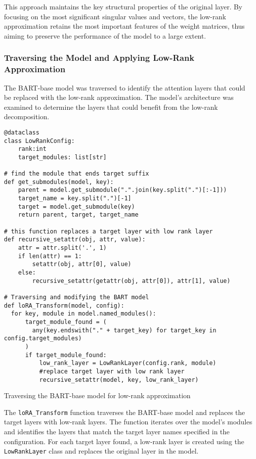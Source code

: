            This approach maintains the key structural properties of the original layer. By focusing on the most significant singular values and vectors, the low-rank approximation retains the most important features of the weight matrices, thus aiming to preserve the performance of the model to a large extent.

    \subsubsection{Traversing the Model and Applying Low-Rank Approximation}
        The BART-base model was traversed to identify the attention layers that could be replaced with the low-rank approximation. The model's architecture was examined to determine the layers that could benefit from the low-rank decomposition.
        \begin{listing}[H]
\begin{verbatim}
@dataclass
class LowRankConfig:
    rank:int
    target_modules: list[str]

# find the module that ends target suffix
def get_submodules(model, key):
    parent = model.get_submodule(".".join(key.split(".")[:-1]))
    target_name = key.split(".")[-1]
    target = model.get_submodule(key)
    return parent, target, target_name

# this function replaces a target layer with low rank layer
def recursive_setattr(obj, attr, value):
    attr = attr.split('.', 1)
    if len(attr) == 1:
        setattr(obj, attr[0], value)
    else:
        recursive_setattr(getattr(obj, attr[0]), attr[1], value)

# Traversing and modifying the BART model
def loRA_Transform(model, config):
  for key, module in model.named_modules():
      target_module_found = (
        any(key.endswith("." + target_key) for target_key in config.target_modules)
      )
      if target_module_found:
          low_rank_layer = LowRankLayer(config.rank, module)
          #replace target layer with low rank layer
          recursive_setattr(model, key, low_rank_layer)
\end{verbatim}
            \caption{Traversing the BART-base model for low-rank approximation}
            \label{listing:LoRA_Transform}
            \end{listing}
            
            The \texttt{loRA\_Transform} function traverses the BART-base model and replaces the target layers with low-rank layers. The function iterates over the model's modules and identifies the layers that match the target layer names specified in the configuration. For each target layer found, a low-rank layer is created using the \texttt{LowRankLayer} class and replaces the original layer in the model.

